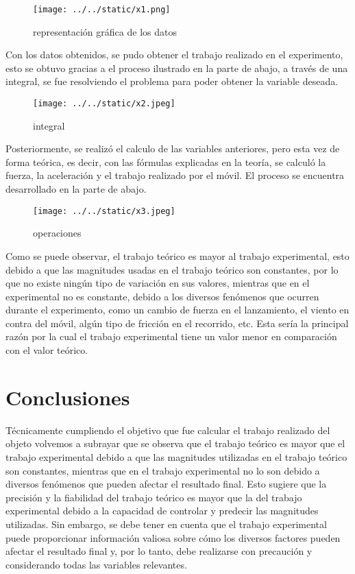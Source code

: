 \documentclass{article}
\begin{document}
\begin{figure}[H]
	\centering	
	\texttt{[image: ../../static/x1.png]}
	\caption{representación gráfica de los datos}
	\label{fig:2}
\end{figure}

Con los datos obtenidos, se pudo obtener el trabajo realizado en el experimento, esto se obtuvo gracias a el proceso ilustrado en la parte de abajo, a través de una integral, se fue resolviendo el problema para poder obtener la variable deseada.

\begin{figure}[H]
	\centering	
	\texttt{[image: ../../static/x2.jpeg]}
	\caption{integral}
	\label{fig:3}
\end{figure}


Posteriormente, se realizó el calculo de las variables anteriores, pero esta vez de forma teórica, es decir, con las fórmulas explicadas en la teoría, se calculó la fuerza, la aceleración y el trabajo realizado por el móvil. El proceso se encuentra desarrollado en la parte de abajo.

\begin{figure}[H]
	\centering	
	\texttt{[image: ../../static/x3.jpeg]}
	\caption{operaciones}
	\label{fig:4}
\end{figure}

Como se puede observar, el trabajo teórico es mayor al trabajo experimental, esto debido a que las magnitudes usadas en el trabajo teórico son constantes, por lo que no existe ningún tipo de variación en sus valores, mientras que en el experimental no es constante, debido a los diversos fenómenos que ocurren durante el experimento, como un cambio de fuerza en el lanzamiento, el viento en contra del móvil, algún tipo de fricción en el recorrido, etc. Esta sería la principal razón por la cual el trabajo experimental tiene un valor menor en comparación con el valor teórico.



\section{Conclusiones}\label{Conclusiones}				%
Técnicamente cumpliendo el objetivo que fue calcular el trabajo realizado del objeto volvemos a subrayar que se observa que el trabajo teórico es mayor que el trabajo experimental debido a que las magnitudes utilizadas en el trabajo teórico son constantes, mientras que en el trabajo experimental no lo son debido a diversos fenómenos que pueden afectar el resultado final. Esto sugiere que la precisión y la fiabilidad del trabajo teórico es mayor que la del trabajo experimental debido a la capacidad de controlar y predecir las magnitudes utilizadas. Sin embargo, se debe tener en cuenta que el trabajo experimental puede proporcionar información valiosa sobre cómo los diversos factores pueden afectar el resultado final y, por lo tanto, debe realizarse con precaución y considerando todas las variables relevantes.
\end{document}
